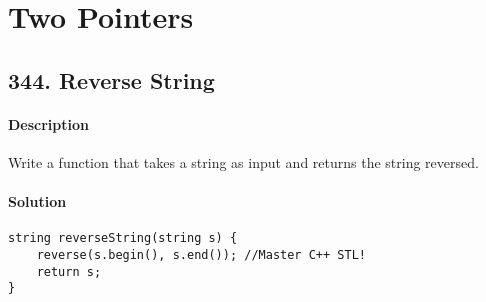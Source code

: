 \section{Two Pointers}

\subsection{344. Reverse String}

\paragraph{\color{white} \colorbox{Mahogany}{Description}}
Write a function that takes a string as input and returns the string reversed.

\paragraph{\color{white} \colorbox{OliveGreen}{Solution}}
\begin{verbatim}
string reverseString(string s) {
    reverse(s.begin(), s.end()); //Master C++ STL!
    return s;
}
\end{verbatim}
